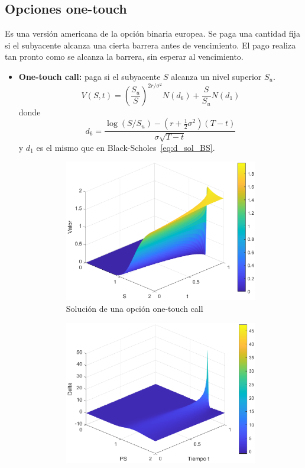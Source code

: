 \subsection{Opciones one-touch}
Es una versión americana de la opción binaria  europea. Se paga una cantidad fija si el subyacente alcanza una cierta barrera antes de vencimiento. El pago realiza tan pronto como se alcanza la barrera, sin esperar al vencimiento.
\begin{itemize}
    \item \textbf{One-touch call:} paga si el subyacente $S$ alcanza un nivel superior $S_u$.
    \[
        \boxed{V(S, t) = \left( \frac{S_u}{S} \right)^{2r/\sigma^2} N(d_6) + \frac{S}{S_u} N(d_1)}
    \]
    donde
    \[
        \boxed{d_6 = \frac{\log(S/S_u) - (r + \frac{1}{2}\sigma^2)(T-t)}{\sigma\sqrt{T-t}}}
    \]
    y $d_1$ es el mismo que en Black-Scholes~\eqref{eq:d_sol_BS}.
    \begin{figure}[H]
        \centering
        \begin{subfigure}[b]{0.35\linewidth}
            \includegraphics[width=\linewidth]{Imagenes/9_Americanas/One_Touch_Call.eps}
            \caption{Solución de una opción one-touch call}
        \end{subfigure}
        \begin{subfigure}[b]{0.35\linewidth}
            \includegraphics[width=\linewidth]{Imagenes/9_Americanas/Delta_One_Touch_Call.eps}

\end{subfigure}
\end{figure}
\end{itemize}
